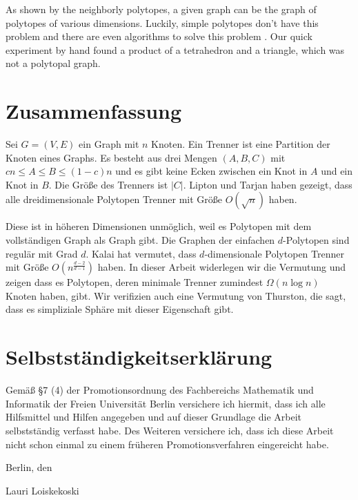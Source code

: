 \documentclass[a4paper,12pt]{book}
\theoremstyle{plain}
\theoremstyle{definition}
\begin{document}
 As shown by the neighborly polytopes, a given graph can be the graph of polytopes of various dimensions. 
Luckily, simple polytopes don't have this problem and there are even algorithms to solve this problem \cite{KALAI1988381} \cite{Achatz2000}. 
Our quick experiment by hand found a product of a tetrahedron and a triangle, which was not a polytopal graph.




\cleardoublepage
{}
{}






\chapter*{Zusammenfassung}

\small{
Sei $G=(V,E)$ ein Graph mit $n$ Knoten.
Ein Trenner ist eine Partition der Knoten eines Graphs. Es besteht aus drei Mengen $(A,B,C)$ mit $cn\le A \le B \le (1-c)n$ und es gibt keine Ecken zwischen ein Knot in $A$ und ein Knot in $B$. Die Grö{\ss}e des Trenners ist $|C|$. Lipton und Tarjan haben gezeigt, dass alle dreidimensionale Polytopen Trenner mit Grö{\ss}e $O(\sqrt{n})$ haben.
 
Diese ist in höheren Dimensionen unmöglich, weil es Polytopen mit dem vollständigen Graph als Graph gibt. Die Graphen der einfachen $d$-Polytopen sind regulär mit Grad $d$. Kalai hat vermutet, dass $d$-dimensionale Polytopen Trenner mit Grö{\ss}e $O(n^{\frac{d-2}{d-1}})$ haben. In dieser Arbeit widerlegen wir die Vermutung und zeigen dass es Polytopen, deren minimale Trenner zumindest $\Omega(n\log n)$ Knoten haben, gibt. Wir verifizien auch eine Vermutung von Thurston, die sagt, dass es simpliziale Sphäre mit dieser Eigenschaft gibt.
}




\chapter*{Selbstst\"andigkeitserkl\"arung}

Gem\"a{\ss} \S 7 (4) der Promotionsordnung des Fachbereichs Mathematik und Informatik der Freien Universit\"at Berlin versichere ich hiermit, dass ich alle Hilfsmittel und Hilfen angegeben und auf dieser Grundlage die Arbeit selbstst\"andig verfasst habe. Des Weiteren versichere ich, dass ich diese Arbeit nicht schon einmal zu einem fr\"uheren Promotionsverfahren eingereicht habe.

\vspace{0.8cm}
\noindent Berlin, den 

\vspace{1.6cm}
\noindent Lauri Loiskekoski
\end{document}
